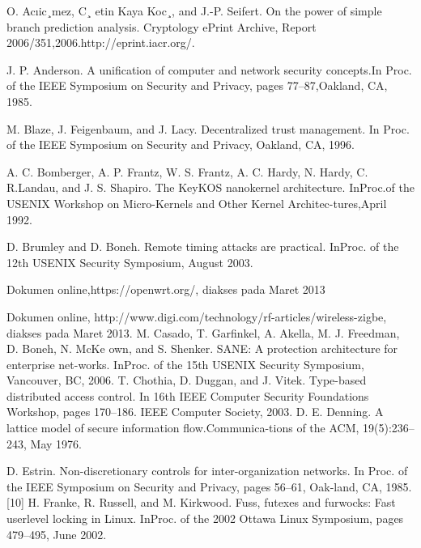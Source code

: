 \documentclass{jtetiproposalskripsi}
\begin{document}

\begin{thebibliography}{9}

O. Acıic¸mez, C¸ etin Kaya Koc¸, and J.-P. Seifert. On the power of simple branch prediction analysis. Cryptology ePrint Archive, Report 2006/351,2006.http://eprint.iacr.org/.


J. P. Anderson. A unification of computer and network security concepts.In Proc. of the IEEE Symposium on Security and Privacy, pages 77–87,Oakland, CA, 1985.


M. Blaze, J. Feigenbaum, and J. Lacy. Decentralized trust management. In Proc. of the IEEE Symposium on Security and Privacy, Oakland, CA, 1996.

A. C. Bomberger, A. P. Frantz, W. S. Frantz, A. C. Hardy, N. Hardy, C. R.Landau, and J. S. Shapiro. The KeyKOS nanokernel architecture. InProc.of the USENIX Workshop on Micro-Kernels and Other Kernel Architec-tures,April 1992.


D. Brumley and D. Boneh. Remote timing attacks are practical. InProc. of the 12th USENIX Security Symposium, August 2003.


Dokumen online,https://openwrt.org/, diakses pada Maret 2013

Dokumen online, http://www.digi.com/technology/rf-articles/wireless-zigbe,
diakses pada Maret 2013.
M. Casado, T. Garfinkel, A. Akella, M. J. Freedman, D. Boneh, N. McKe own, and S. Shenker. SANE: A protection architecture for enterprise net-works. InProc. of the 15th USENIX Security Symposium, Vancouver, BC,
2006.
T. Chothia, D. Duggan, and J. Vitek. Type-based distributed access control.
      In 16th IEEE Computer Security Foundations Workshop, pages 170–186.
      IEEE Computer Society, 2003.
 D. E. Denning. A lattice model of secure information flow.Communica-tions    of the ACM, 19(5):236–243, May 1976.


 D. Estrin. Non-discretionary controls for inter-organization networks. In
Proc. of the IEEE Symposium on Security and Privacy, pages 56–61, Oak-land, CA, 1985.
[10] H. Franke, R. Russell, and M. Kirkwood. Fuss, futexes and furwocks: Fast
userlevel locking in Linux. InProc. of the 2002 Ottawa Linux Symposium,
pages 479–495, June 2002.

\end{thebibliography}
\end{document}
